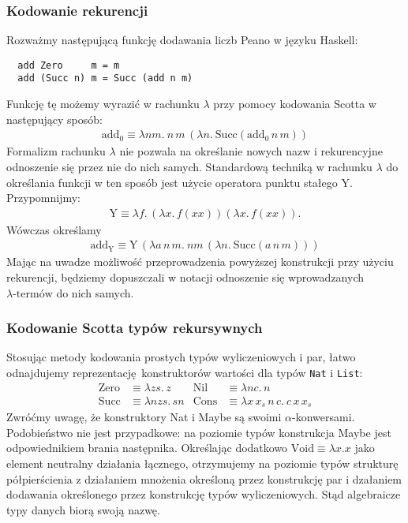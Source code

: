 \subsubsection{Kodowanie rekurencji}\label{sec:adt_recurrency}
 Rozważmy następującą funkcję dodawania liczb Peano w języku Haskell:
\begin{verbatim}
  add Zero     m = m
  add (Succ n) m = Succ (add n m)
\end{verbatim}
Funkcję tę możemy wyrazić w rachunku \(\lambda\) przy pomocy kodowania Scotta w następujący sposób:
\begin{align*}
  \mathrm{add_0} \equiv \lambda n m.\:n\,m\,(\lambda n.\:\mathrm{Succ}(\mathrm{add_0}\,n\,m))
\end{align*}
Formalizm rachunku \(\lambda\) nie pozwala na określanie nowych nazw i rekurencyjne odnoszenie się przez nie do nich samych. Standardową techniką w rachunku \(\lambda\) do określania funkcji w ten sposób jest użycie operatora punktu stałego Y. Przypomnijmy:
\begin{align*}
  \mathrm{Y}\equiv\lambda f.\,(\lambda x.\,f(xx))(\lambda x.\,f(xx)).
\end{align*}
Wówczas określamy
\begin{align*}
  \mathrm{add_Y}\equiv \mathrm{Y}\,(\lambda a\,n\, m .\ n m\,(\lambda n.\ \mathrm{Succ} (a\,n\,m)))
\end{align*}
Mając na uwadze możliwość przeprowadzenia powyższej konstrukcji przy użyciu rekurencji, będziemy dopuszczali w notacji odnoszenie się wprowadzanych \({\lambda\text{-termów}}\) do nich samych.

\subsubsection{Kodowanie Scotta typów rekursywnych}
Stosując metody kodowania prostych typów wyliczeniowych i par, łatwo odnajdujemy reprezentację konstruktorów wartości dla typów \texttt{Nat} i \texttt{List}:
\begin{align*}
  \mathrm{Zero} &\equiv \lambda z s .\, z     & \mathrm{Nil} &\equiv \lambda n c.\,n\\
  \mathrm{Succ} &\equiv \lambda n z s.\,sn    & \mathrm{Cons} &\equiv \lambda x \, x_s \, n\, c.\ c \, x \, x_s
\end{align*}
  Zwróćmy uwagę, że konstruktory Nat i Maybe są swoimi \(\alpha\)-konwersami. Podobieństwo nie jest przypadkowe: na poziomie typów konstrukcja Maybe jest odpowiednikiem brania następnika. Określając dodatkowo \(\mathrm{Void}\equiv\lambda x.x\) jako element neutralny działania łącznego, otrzymujemy na poziomie typów strukturę półpierścienia z działaniem mnożenia określoną przez konstrukcję par i dzałaniem dodawania określonego przez konstrukcję typów wyliczeniowych. Stąd algebraicze typy danych biorą swoją nazwę.

